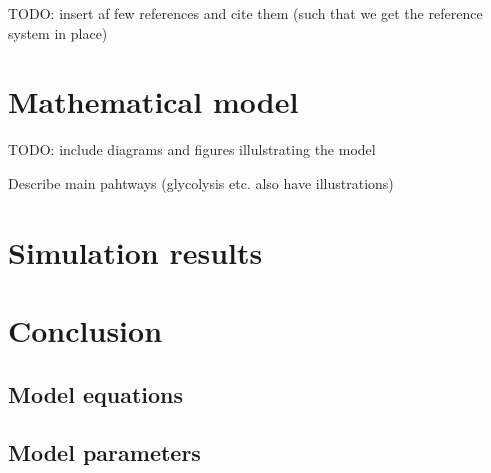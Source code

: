 \documentclass{IEEEtran}
\begin{document}
TODO: insert af few references and cite them (such that we get the reference system in place)


\section{Mathematical model}
\label{sec:mathmaticalmodel}

TODO: include diagrams and figures illulstrating the model

Describe main pahtways (glycolysis etc. also have illustrations)

\section{Simulation results}
\label{sec:simulationresults}

\section{Conclusion}
\label{sec:conclusion}


\appendix
\subsection{Model equations}

\subsection{Model parameters}
\end{document}
